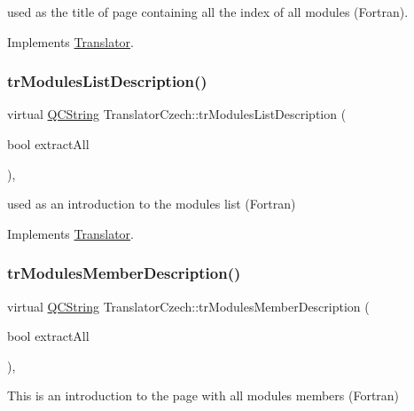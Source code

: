 used as the title of page containing all the index of all modules (Fortran). 

Implements \mbox{\hyperlink{class_translator}{Translator}}.

\mbox{\label{class_translator_czech_ac17790e5e208d3690f2d7229dac54796}} 
\subsubsection{\texorpdfstring{trModulesListDescription()}{trModulesListDescription()}}
{\footnotesize\ttfamily virtual \mbox{\hyperlink{class_q_c_string}{Q\+C\+String}} Translator\+Czech\+::tr\+Modules\+List\+Description (\begin{DoxyParamCaption}\item[{bool}]{extract\+All }\end{DoxyParamCaption})\hspace{0.3cm}{\ttfamily [inline]}, {\ttfamily [virtual]}}

used as an introduction to the modules list (Fortran) 

Implements \mbox{\hyperlink{class_translator}{Translator}}.

\mbox{\label{class_translator_czech_af11829e16f9321de681d68696a228aae}} 
\subsubsection{\texorpdfstring{trModulesMemberDescription()}{trModulesMemberDescription()}}
{\footnotesize\ttfamily virtual \mbox{\hyperlink{class_q_c_string}{Q\+C\+String}} Translator\+Czech\+::tr\+Modules\+Member\+Description (\begin{DoxyParamCaption}\item[{bool}]{extract\+All }\end{DoxyParamCaption})\hspace{0.3cm}{\ttfamily [inline]}, {\ttfamily [virtual]}}

This is an introduction to the page with all modules members (Fortran) 


